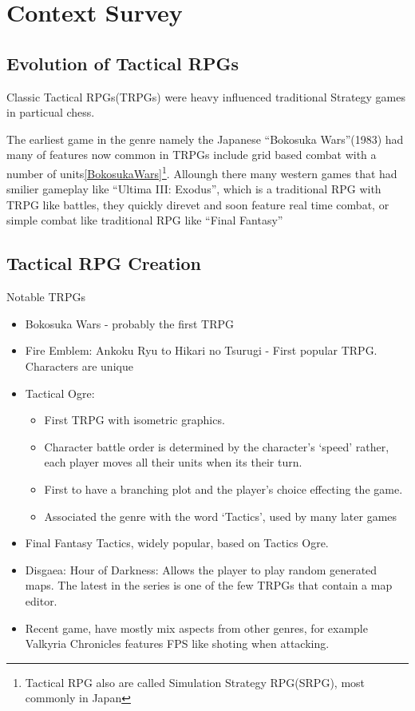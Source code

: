 
\section{Context Survey} 
\label{Context_Survey}

\subsection{Evolution of Tactical RPGs }
\label{sub:evolution_of_tactical_rpgs_}

Classic Tactical RPGs(TRPGs)  were heavy influenced traditional Strategy games in particual  chess. 

The earliest game in the genre namely the Japanese ``Bokosuka Wars''(1983) had many of features now common in TRPGs include grid based combat with a number of units\ref{BokosukaWars}\footnote{Tactical RPG also are called Simulation Strategy RPG(SRPG),  most commonly in Japan}. Alloungh there many western  games that had smilier gameplay like ``Ultima III: Exodus'', which is a traditional RPG with TRPG like battles, they quickly direvet and soon feature real time combat, or simple combat like traditional RPG like ``Final Fantasy''

\subsection{Tactical RPG Creation}

Notable TRPGs
\begin{itemize}
	\item Bokosuka Wars  - probably the first TRPG
	\item Fire Emblem: Ankoku Ryu to Hikari no Tsurugi  -  First popular TRPG.  Characters are unique
	\item Tactical Ogre:  
	\begin{itemize}
		\item  First TRPG with isometric graphics.
		\item Character battle order is determined by the character's `speed' rather, each player moves all their units when its their turn.
		\item  First to have a branching plot and the player's choice effecting the game.
		\item  Associated the genre with the word `Tactics', used by many later games
	\end{itemize}      
	\item Final Fantasy Tactics, widely popular, based on Tactics Ogre.
	\item Disgaea: Hour of Darkness:  Allows the player to play random generated maps. The latest in the series is one of the few TRPGs that contain a map editor.  
	\item Recent game, have mostly mix aspects from other genres, for example Valkyria Chronicles features FPS like shoting when attacking.
\end{itemize}


